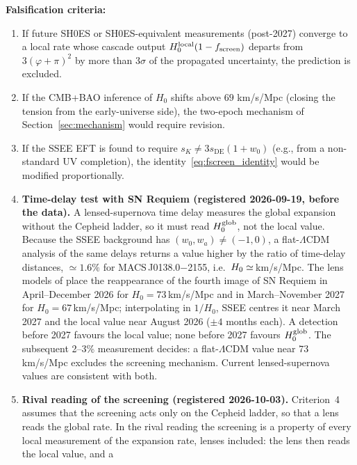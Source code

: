 \documentclass[12pt,a4paper]{article}
\newcommand{\phiG}{\varphi}
\newcommand{\fsc}{f_{\mathrm{screen}}}
\newcommand{\sK}{s_K}          %
\newcommand{\sDE}{s_{\mathrm{DE}}} %
\begin{document}
\noindent\textbf{Falsification criteria:}
\begin{enumerate}
  \item If future SH0ES or SH0ES-equivalent measurements (post-2027)
        converge to a local rate whose cascade output $H_0^{\rm local}(1-\fsc)$
        departs from $3(\phiG+\pi)^2$ by more than $3\sigma$ of the propagated
        uncertainty, the prediction is excluded.
  \item If the CMB+BAO inference of $H_0$ shifts above $69$ km/s/Mpc
        (closing the tension from the early-universe side), the two-epoch
        mechanism of Section~\ref{sec:mechanism} would require revision.
  \item If the SSEE EFT is found to require $\sK \neq 3\sDE(1+w_0)$
        (e.g., from a non-standard UV completion), the identity~\eqref{eq:fscreen_identity}
        would be modified proportionally.
  \item \textbf{Time-delay test with SN Requiem (registered 2026-09-19,
        before the data).}
        A lensed-supernova time delay measures the global expansion without
        the Cepheid ladder, so it must read $H_0^{\rm glob}$, not the local
        value. Because the SSEE background has $(w_0,w_a)\neq(-1,0)$, a
        flat-$\Lambda$CDM analysis of the same delays returns a value higher
        by the ratio of time-delay distances, $\simeq 1.6\%$ for
        MACS\,J0138.0$-$2155, i.e.\ $H_0\simeq \val{requiem_C_H0}$\,km/s/Mpc.
        The lens models of \citet{Suyu2026} place the reappearance of the
        fourth image of SN Requiem in April--December 2026 for
        $H_0=73$\,km/s/Mpc and in March--November 2027 for
        $H_0=67$\,km/s/Mpc; interpolating in $1/H_0$, SSEE centres it near
        March 2027 and the local value near August 2026 ($\pm 4$ months each).
        A detection before 2027 favours the local value; none before 2027
        favours $H_0^{\rm glob}$. The subsequent 2--3\% measurement decides:
        a flat-$\Lambda$CDM value near $73$\,km/s/Mpc excludes the screening
        mechanism. Current lensed-supernova values \citep{Pierel2025,Bazzanini2026}
        are consistent with both.
  \item \textbf{Rival reading of the screening (registered 2026-10-03).}
        Criterion~4 assumes that the screening acts only on the Cepheid
        ladder, so that a lens reads the global rate. In the rival reading the
        screening is a property of every local measurement of the expansion
        rate, lenses included: the lens then reads the local value, and a

\end{enumerate}
\end{document}
